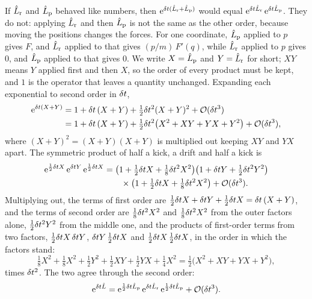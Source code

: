 If $\hat{L}_{\mathrm r}$ and $\hat{L}_{\mathrm p}$ behaved like numbers, then
$\mathrm{e}^{\delta t(\hat{L}_{\mathrm r} + \hat{L}_{\mathrm p})}$ would equal
$\mathrm{e}^{\delta t\hat{L}_{\mathrm r}}\,\mathrm{e}^{\delta t\hat{L}_{\mathrm p}}$. They
do not: applying $\hat{L}_{\mathrm r}$ and then $\hat{L}_{\mathrm p}$ is not
the same as the other order, because moving the positions changes the
forces. For one coordinate, $\hat{L}_{\mathrm p}$ applied to $p$ gives $F$,
and $\hat{L}_{\mathrm r}$ applied to that gives $(p/m)\,F'(q)$, while
$\hat{L}_{\mathrm r}$ applied to $p$ gives 0, and $\hat{L}_{\mathrm p}$ applied
to that gives 0. We write $X = \hat{L}_{\mathrm p}$ and $Y = \hat{L}_{\mathrm
r}$ for short; $XY$ means $Y$ applied first and then $X$, so the order of
every product must be kept, and $1$ is the operator that leaves a quantity
unchanged. Expanding each exponential to second order in $\delta t$,
\begin{align*}
   \mathrm{e}^{\delta t(X + Y)} &= 1 + \delta t\,(X + Y) + \tfrac12\delta t^2(X + Y)^2
   + \mathcal{O}(\delta t^3)\\
   &= 1 + \delta t\,(X + Y) + \tfrac12\delta t^2\bigl(X^2 + XY + YX + Y^2\bigr)
   + \mathcal{O}(\delta t^3) ,
\end{align*}
where $(X + Y)^2 = (X + Y)(X + Y)$ is multiplied out keeping $XY$ and $YX$
apart. The symmetric product of half a kick, a drift and half a kick is
\begin{align*}
   \mathrm{e}^{\frac12\delta t X}\,\mathrm{e}^{\delta t Y}\,\mathrm{e}^{\frac12\delta t X}
   &= \bigl(1 + \tfrac12\delta t X + \tfrac18\delta t^2X^2\bigr)
   \bigl(1 + \delta t Y + \tfrac12\delta t^2Y^2\bigr)\\
   &\qquad\times\bigl(1 + \tfrac12\delta t X + \tfrac18\delta t^2X^2\bigr)
   + \mathcal{O}(\delta t^3) .
\end{align*}
Multiplying out, the terms of first order are $\frac12\delta t X + \delta t Y +
\frac12\delta t X = \delta t\,(X + Y)$, and the terms of second order are
$\frac18\delta t^2X^2$ and $\frac18\delta t^2X^2$ from the outer factors alone,
$\frac12\delta t^2Y^2$ from the middle one, and the products of first-order
terms from two factors, $\frac12\delta t X\,\delta t Y$, $\delta t Y\,\frac12\delta t X$ and
$\frac12\delta t X\,\frac12\delta t X$, in the order in which the factors stand:
\begin{equation*}
   \tfrac18X^2 + \tfrac18X^2 + \tfrac12Y^2 + \tfrac12XY + \tfrac12YX
   + \tfrac14X^2 = \tfrac12\bigl(X^2 + XY + YX + Y^2\bigr) ,
\end{equation*}
times $\delta t^2$. The two agree through the second order:
\begin{equation}
   \mathrm{e}^{\delta t\hat{L}} = \mathrm{e}^{\frac12\delta t\hat{L}_{\mathrm p}}\,
   \mathrm{e}^{\delta t\hat{L}_{\mathrm r}}\,\mathrm{e}^{\frac12\delta t\hat{L}_{\mathrm p}}
   + \mathcal{O}(\delta t^3) .
   \label{eq:in-trotter}
\end{equation}
